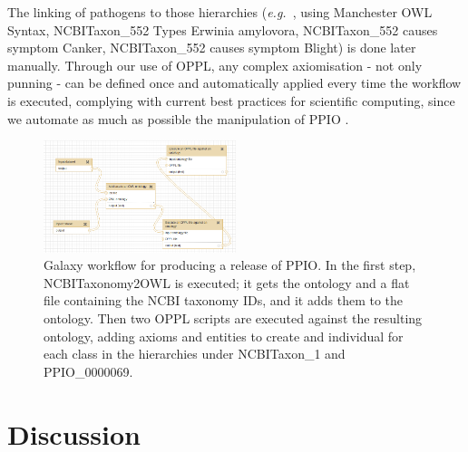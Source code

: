 \documentclass[sw]{iosart2c}
\newcommand{\eg}{\emph{e.g.}\xspace}
\begin{document}
The linking of pathogens to those hierarchies (\eg~, using Manchester OWL Syntax, {\sf NCBITaxon\_552 Types Erwinia amylovora}, {\sf NCBITaxon\_552 causes symptom Canker}, {\sf NCBITaxon\_552 causes symptom Blight}) is done later manually. Through our use of OPPL, any complex axiomisation - not only punning - can be defined once and automatically applied every time the workflow is executed, complying with current best practices for scientific computing, since we automate as much as possible the manipulation of PPIO \cite{bp_computing}.

\begin{figure}
\includegraphics[width=0.5\textwidth]{galaxy-workflow.png}
\caption{Galaxy workflow for producing a release of PPIO. In the first step, NCBITaxonomy2OWL is executed; it gets the ontology and a flat file containing the NCBI taxonomy IDs, and it adds them to the ontology. Then two OPPL scripts are executed against the resulting ontology, adding axioms and entities to create and individual for each class in the hierarchies under {\sf NCBITaxon\_1} and {\sf PPIO\_0000069}.}\label{fig:galaxy-workflow}
\end{figure}


\section{Discussion}\label{sec:discussion}
\end{document}
